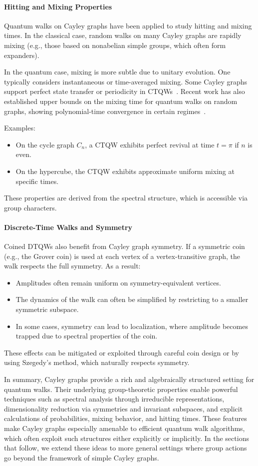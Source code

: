 \documentclass[12pt]{report}
\begin{document}
\paragraph{Hitting and Mixing Properties}
Quantum walks on Cayley graphs have been applied to study hitting and mixing times. In the classical case, random walks on many Cayley graphs are rapidly mixing (e.g., those based on nonabelian simple groups, which often form expanders).

In the quantum case, mixing is more subtle due to unitary evolution. One typically considers instantaneous or time-averaged mixing. Some Cayley graphs support perfect state transfer or periodicity in CTQWs~\cite{Gerhardt2003}. Recent work has also established upper bounds on the mixing time for quantum walks on random graphs, showing polynomial-time convergence in certain regimes~\cite{Chakraborty2020}.

Examples:
\begin{itemize}
    \item On the cycle graph $C_n$, a CTQW exhibits perfect revival at time $t = \pi$ if $n$ is even.
    \item On the hypercube, the CTQW exhibits approximate uniform mixing at specific times.
\end{itemize}
These properties are derived from the spectral structure, which is accessible via group characters.

\paragraph{Discrete-Time Walks and Symmetry}
Coined DTQWs also benefit from Cayley graph symmetry. If a symmetric coin (e.g., the Grover coin) is used at each vertex of a vertex-transitive graph, the walk respects the full symmetry. As a result:
\begin{itemize}
    \item Amplitudes often remain uniform on symmetry-equivalent vertices.
    \item The dynamics of the walk can often be simplified by restricting to a smaller symmetric subspace.
    \item In some cases, symmetry can lead to localization, where amplitude becomes trapped due to spectral properties of the coin.
\end{itemize}
These effects can be mitigated or exploited through careful coin design or by using Szegedy’s method, which naturally respects symmetry.

In summary, Cayley graphs provide a rich and algebraically structured setting for quantum walks. Their underlying group-theoretic properties enable powerful techniques such as spectral analysis through irreducible representations, dimensionality reduction via symmetries and invariant subspaces, and explicit calculations of probabilities, mixing behavior, and hitting times. These features make Cayley graphs especially amenable to efficient quantum walk algorithms, which often exploit such structures either explicitly or implicitly. In the sections that follow, we extend these ideas to more general settings where group actions go beyond the framework of simple Cayley graphs.
\end{document}
